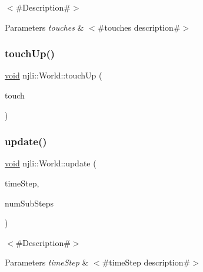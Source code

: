 $<$\#\+Description\#$>$


\begin{DoxyParams}{Parameters}
{\em touches} & $<$\#touches description\#$>$ \\
\hline
\end{DoxyParams}
\mbox{\label{classnjli_1_1_world_a9d64d3a8310bba9935bf998ec9d341e8}} 
\subsubsection{\texorpdfstring{touch\+Up()}{touchUp()}\hspace{0.1cm}{\footnotesize\ttfamily [2/2]}}
{\footnotesize\ttfamily \mbox{\hyperlink{_thread_8h_af1e856da2e658414cb2456cb6f7ebc66}{void}} njli\+::\+World\+::touch\+Up (\begin{DoxyParamCaption}\item[{const \mbox{\hyperlink{classnjli_1_1_device_touch}{Device\+Touch}} \&}]{touch }\end{DoxyParamCaption})}

\mbox{\label{classnjli_1_1_world_a248c324a0a97b0f286eaedf8f997688e}} 
\subsubsection{\texorpdfstring{update()}{update()}}
{\footnotesize\ttfamily \mbox{\hyperlink{_thread_8h_af1e856da2e658414cb2456cb6f7ebc66}{void}} njli\+::\+World\+::update (\begin{DoxyParamCaption}\item[{\mbox{\hyperlink{_util_8h_a5f6906312a689f27d70e9d086649d3fd}{f32}}}]{time\+Step,  }\item[{const \mbox{\hyperlink{_util_8h_a10e94b422ef0c20dcdec20d31a1f5049}{u32}}}]{num\+Sub\+Steps }\end{DoxyParamCaption})}

$<$\#\+Description\#$>$


\begin{DoxyParams}{Parameters}
{\em time\+Step} & $<$\#time\+Step description\#$>$ \\
\hline
\end{DoxyParams}


